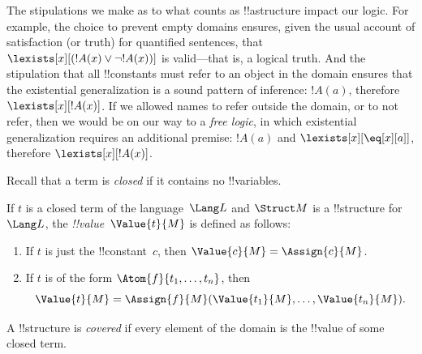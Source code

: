 \begin{digress}
The stipulations we make as to what counts as !!a{structure} impact
our logic. For example, the choice to prevent empty domains ensures,
given the usual account of satisfaction (or truth) for quantified
sentences, that $\lexists[x][(!A(x) \lor \lnot !A(x))]$ is
valid---that is, a logical truth. And the stipulation that all
!!{constant}s must refer to an object in the domain ensures that the
existential generalization is a sound pattern of inference: $!A(a)$,
therefore $\lexists[x][!A(x)]$. If we allowed names to refer outside
the domain, or to not refer, then we would be on our way to a
\emph{free logic}, in which existential generalization requires an
additional premise: $!A(a)$ and $\lexists[x][\eq[x][a]]$, therefore
$\lexists[x][!A(x)]$.
\end{digress}







\begin{explain}
Recall that a term is \emph{closed} if it contains no !!{variable}s.
\end{explain}

\begin{defn}
If $t$ is a closed term of the language~$\Lang L$ and $\Struct M$ is a
!!{structure} for~$\Lang L$, the \emph{!!{value}}~$\Value{t}{M}$ is
defined as follows:
\begin{enumerate}
\item If $t$ is just the !!{constant}~$c$, then $\Value{c}{M} = \Assign{c}{M}$.
\item If $t$ is of the form $\Atom{f}{t_1, \ldots, t_n}$, then
  \[
  \Value{t}{M} = \Assign{f}{M}(\Value{t_1}{M}, \ldots,
  \Value{t_n}{M}).
  \]
\end{enumerate}
\end{defn}

\begin{defn}
A !!{structure} is \emph{covered} if every element of the domain is the
!!{value} of some closed term.
\end{defn}

